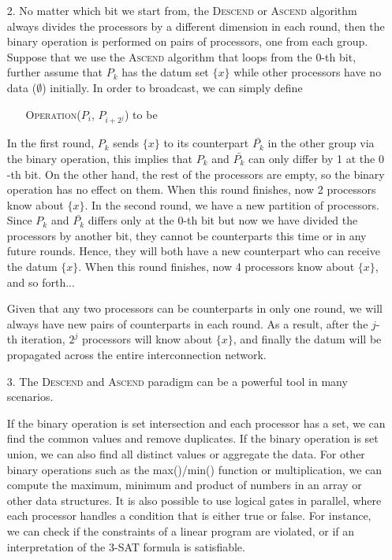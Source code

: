 \documentclass[11pt]{article}
\begin{document}
    \begin{enumerate}[leftmargin=*]
      \item[2.] No matter which bit we start from, the \textsc{Descend} or \textsc{Ascend} algorithm always divides the processors by a different dimension in each round, then the binary operation is performed on pairs of processors, one from each group. Suppose that we use the \textsc{Ascend} algorithm that loops from the $0$-th bit, further assume that $P_k$ has the datum set $\{x\}$ while other processors have no data ($\emptyset$) initially. In order to broadcast, we can simply define
      \begin{enumerate}
          \item[] \textsc{Operation}($P_i$, $P_{i+2^j}$) to be 
      \end{enumerate}

      In the first round, $P_k$ sends $\{x\}$ to its counterpart $\bar{P_{k}}$ in the other group via the binary operation, this implies that $P_k$ and $\bar{P_{k}}$ can only differ by 1 at the $0$-th bit. On the other hand, the rest of the processors are empty, so the binary operation has no effect on them. When this round finishes, now 2 processors know about $\{x\}$. In the second round, we have a new partition of processors. Since $P_k$ and $\bar{P_{k}}$ differs only at the $0$-th bit but now we have divided the processors by another bit, they cannot be counterparts this time or in any future rounds. Hence, they will both have a new counterpart who can receive the datum $\{x\}$. When this round finishes, now 4 processors know about $\{x\}$, and so forth...

      Given that any two processors can be counterparts in only one round, we will always have new pairs of counterparts in each round. As a result, after the $j$-th iteration, $2^j$ processors will know about $\{x\}$, and finally the datum will be propagated across the entire interconnection network.

      \item[3.] The \textsc{Descend} and \textsc{Ascend} paradigm can be a powerful tool in many scenarios.

      If the binary operation is set intersection and each processor has a set, we can find the common values and remove duplicates. If the binary operation is set union, we can also find all distinct values or aggregate the data. For other binary operations such as the max()/min() function or multiplication, we can compute the maximum, minimum and product of numbers in an array or other data structures. It is also possible to use logical gates in parallel, where each processor handles a condition that is either true or false. For instance, we can check if the constraints of a linear program are violated, or if an interpretation of the 3-SAT formula is satisfiable.
    \end{enumerate}

  \vspace{8mm}
  \printbibliography

  \vfill
  \doclicenseThis
\end{document}
